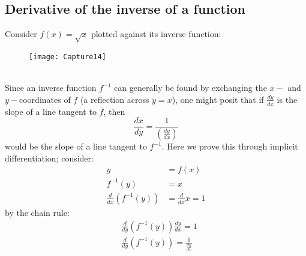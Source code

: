 \documentclass{report}
\begin{document}
\subsection{Derivative of the inverse of a function} %
Consider $f(x)=\sqrt{x}$ plotted against its inverse function:
\begin{figure}[h]
\texttt{[image: Capture14]}
\centering
{}
\end{figure}\\
Since an inverse function $f^{-1}$ can generally be found by exchanging the $x-$ and 
$y-$coordinates of $f$ (a reflection across $y=x$), one might posit that if $\frac{dy}{dx}$ is
the slope of a line tangent to $f$, then
\begin{equation*}
\frac{dx}{dy}=\frac{1}{(\frac{dy}{dx})}
\end{equation*}
would be the slope of a line tangent to $f^{-1}$. Here we prove this through
implicit differentiation; consider:
\begin{align*}
y&=f(x)\\
f^{-1}(y)&=x\\
\frac{d}{dx}(f^{-1}(y))&=\frac{d}{dx}x=1
\end{align*}
by the chain rule:
\begin{align*}
&\frac{d}{dy}(f^{-1}(y))\frac{dy}{dx}=1\\
&\frac{d}{dy}(f^{-1}(y))=\frac{1}{\frac{dy}{dx}}
\end{align*}
\newpage
\end{document}
